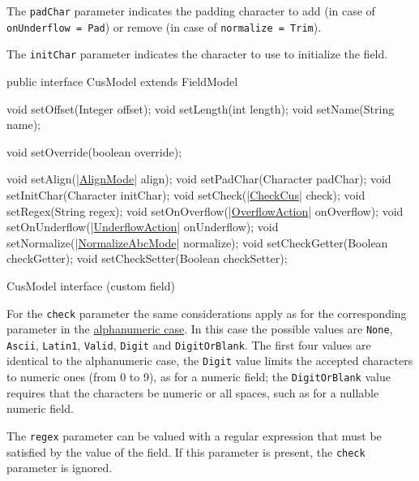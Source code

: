 The \verb!padChar! parameter indicates the padding character to add (in case of 
\texttt{onUnderflow = Pad}) or remove (in case of \texttt{normalize = Trim}). 

The \verb!initChar! parameter indicates the character to use to initialize the 
field.

\begin{elisting}[!htb]
\begin{javacode}
public interface CusModel extends FieldModel {
    void setOffset(Integer offset);
    void setLength(int length);
    void setName(String name);
    
    void setOverride(boolean override);
    
    void setAlign(|\hyperref[lst:AlignMode]{AlignMode}| align);
    void setPadChar(Character padChar);
    void setInitChar(Character initChar);
    void setCheck(|\hyperref[lst:CheckCus]{CheckCus}| check);
    void setRegex(String regex);
    void setOnOverflow(|\hyperref[lst:OverflowAction]{OverflowAction}| onOverflow);
    void setOnUnderflow(|\hyperref[lst:UnderflowAction]{UnderflowAction}| onUnderflow);
    void setNormalize(|\hyperref[lst:NormalizeAbcMode]{NormalizeAbcMode}| normalize);
    void setCheckGetter(Boolean checkGetter);
    void setCheckSetter(Boolean checkSetter);
}
\end{javacode}
\caption{CusModel interface (custom field)}
\label{lst:CusModel}
\end{elisting}

For the \verb!check! parameter the same considerations apply as for the 
corresponding parameter in the \hyperlink{abc:chk}{alphanumeric case}. 
In this case the possible values are \verb!None!, \verb!Ascii!, \verb!Latin1!, 
\verb!Valid!, \verb!Digit! and \verb!DigitOrBlank!. 
The first four values are identical to the alphanumeric case, the \verb!Digit! 
value limits the accepted characters to numeric ones (from 0 to 9), as for a 
numeric field; the \verb!DigitOrBlank! value requires that the characters be 
numeric or all spaces, such as for a nullable numeric field.

The \verb!regex! parameter can be valued with a regular expression that must be 
satisfied by the value of the field. If this parameter is present, the 
\verb!check! parameter is ignored.

